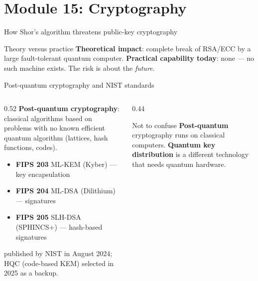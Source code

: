 \documentclass[aspectratio=169,11pt]{beamer}
\newcommand{\key}[1]{{\color{qdark}\textbf{#1}}}
\begin{document}
\section{Module 15: Cryptography}
\begin{frame}[label=fThreat]{How Shor's algorithm threatens public-key cryptography}
  \footnotesize
  \begin{center}
  \end{center}
  \begin{block}{Theory versus practice}
    \small \key{Theoretical impact}: complete break of RSA/ECC by a large fault-tolerant quantum computer. \key{Practical capability today}: none ---
    no such machine exists. The risk is about the \emph{future}.
  \end{block}
\end{frame}

\begin{frame}[label=fPQC]{Post-quantum cryptography and NIST standards}
  \begin{columns}[T]
    \begin{column}{0.52\textwidth}
      \small
      \key{Post-quantum cryptography}: classical algorithms based on problems with no known efficient quantum algorithm (lattices, hash functions, codes).
      \begin{itemize}\itemsep1pt
        \item \key{FIPS 203} ML-KEM (Kyber) --- key encapsulation
        \item \key{FIPS 204} ML-DSA (Dilithium) --- signatures
        \item \key{FIPS 205} SLH-DSA (SPHINCS+) --- hash-based signatures
      \end{itemize}
      published by NIST in August 2024; HQC (code-based KEM) selected in 2025 as a backup.
    \end{column}
    \begin{column}{0.44\textwidth}
      \begin{alertblock}{Not to confuse}
        \small \key{Post-quantum} cryptography runs on classical computers. \key{Quantum key distribution} is a different technology that needs quantum hardware.
      \end{alertblock}
    \end{column}
  \end{columns}
\end{frame}
\end{document}
